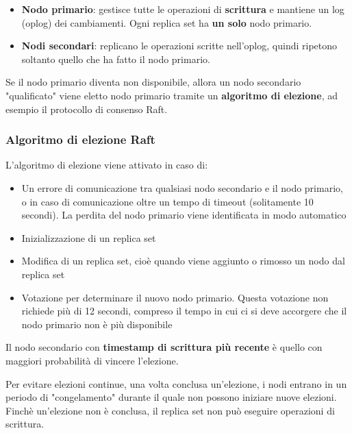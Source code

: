 \documentclass[a4paper,twoside]{article}
\begin{document}
\begin{itemize}
  \item \textbf{Nodo primario}: gestisce tutte le operazioni di \textbf{scrittura}
    e mantiene un log (oplog) dei cambiamenti. Ogni replica set ha \textbf{un solo} nodo
    primario.

  \item \textbf{Nodi secondari}: replicano le operazioni scritte nell'oplog, quindi
    ripetono soltanto quello che ha fatto il nodo primario.
\end{itemize}
Se il nodo primario diventa non disponibile, allora un nodo secondario "qualificato"
viene eletto nodo primario tramite un \textbf{algoritmo di elezione}, ad esempio
il protocollo di consenso Raft.

\subsubsection{Algoritmo di elezione Raft}
L'algoritmo di elezione viene attivato in caso di:
\begin{itemize}
  \item Un errore di comunicazione tra
    qualsiasi nodo secondario e il nodo primario, o in caso di comunicazione oltre
    un tempo di timeout (solitamente 10 secondi). La perdita del nodo primario viene
    identificata in modo automatico

  \item Inizializzazione di un replica set

  \item Modifica di un replica set, cioè quando viene aggiunto o rimosso un nodo
    dal replica set

  \item Votazione per determinare il nuovo nodo primario. Questa votazione non
    richiede più di 12 secondi, compreso il tempo in cui ci si deve accorgere
    che il nodo primario non è più disponibile
\end{itemize}

\vspace{1em}
\noindent
Il nodo secondario con \textbf{timestamp di scrittura più recente} è quello
con maggiori probabilità di vincere l'elezione.

Per evitare elezioni continue, una volta conclusa un'elezione, i nodi entrano
in un periodo di "congelamento" durante il quale non possono iniziare nuove elezioni.
Finchè un'elezione non è conclusa, il replica set non può eseguire operazioni di
scrittura.
\end{document}
